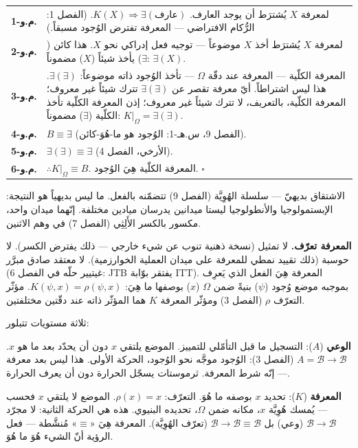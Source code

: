 \documentclass[10pt, openany, oneside]{book}
\renewcommand{\footnotesize}{\fontsize{8.5}{11}\selectfont}
\begin{document}
{\footnotesize
\noindent\begin{tabular}{r p{}}
\textbf{م.و-1.} & لمعرفة $X$ يُشترَط أن يوجد العارف. $K(X) \Rightarrow \exists(\text{عارف})$. (الفصل 1: الرُّكام الافتراضي --- المعرفة تفترض الوُجود مسبقاً.) \\[0.3em]
\textbf{م.و-2.} & لمعرفة $X$ يُشترَط أخذ $X$ موضوعاً --- توجيه فعل إدراكي نحو $X$. هذا كائن ($\exists$) يأخذ شيئاً ($X$) مضموناً: $\exists(X)$. \\[0.3em]
\textbf{م.و-3.} & المعرفة الكلّية --- المعرفة عند دقّة $\Omega$ --- تأخذ الوُجود ذاته موضوعاً: $\exists(\exists)$. هذا ليس اشتراطاً. أيّ معرفة تقصر عن $\exists(\exists)$ تترك شيئاً غير معروف؛ المعرفة الكلّية، بالتعريف، لا تترك شيئاً غير معروف؛ إذن المعرفة الكلّية تأخذ الكلّية ($\exists$) مضموناً: $K|_{\Omega} = \exists(\exists)$. \\[0.3em]
\textbf{م.و-4.} & $B \equiv \exists$ (الفصل 9، س.هـ-1: الوُجود هو ما-هُوَ-كائن). \\[0.3em]
\textbf{م.و-5.} & $\exists(\exists) \equiv \exists$ (الأرخي، الفصل 4). \\[0.3em]
\textbf{م.و-6.} & $\therefore K|_{\Omega} \equiv B$. المعرفة الكلّية هِيَ الوُجود. $\square$ \\[0.3em]
\end{tabular}
}

\vspace{0.8em}

\noindent الاشتقاق بديهيّ --- سلسلة الهُوِيَّة (الفصل 9) تتضمّنه بالفعل. ما ليس بديهياً هو النتيجة: الإبستمولوجيا والأنطولوجيا ليستا ميدانين يدرسان ميادين مختلفة. إنّهما ميدان واحد، مكسور بالكسر الأَلِثِي (الفصل 7) في وهم الاثنين.

\textbf{المعرفة تعرّف.} لا تمثيل (نسخة ذهنية تنوب عن شيء خارجي --- ذلك يفترض الكسر). لا حوسبة (ذلك تقييد نمطي للمعرفة على ميدان العملية الخوارزمية). لا معتقد صادق مبرَّر (غيتيير حلّه في الفصل 6: JTB يفتقر بوّابة ITT). المعرفة هِيَ الفعل الذي يَعرِف بموجبه موضع وُجود ($\psi$) بنيةً ضمن $\Omega$ ($x$) بوصفها ما هِيَ: $K(\psi, x) = \rho(\psi, x)$. مؤثّر التعرّف $\rho$ (الفصل 3) ومؤثّر المعرفة $K$ هما المؤثّر ذاته عند دقّتين مختلفتين.

ثلاثة مستويات تتبلور:

\textbf{الوعي} ($A$): التسجيل ما قبل التأمّلي للتمييز. الموضع يلتقي $x$ دون أن يحدّد بعد ما هو $x$. $A = \mathcal{B} \to \mathcal{B}$ (الفصل 3): الوُجود موجَّه نحو الوُجود، الحركة الأولى. هذا ليس بعد معرفة --- إنّه شرط المعرفة. ثرموستات يسجّل الحرارة دون أن يعرف الحرارة.

\textbf{المعرفة} ($K$): تحديد $x$ بوصفه ما هُوَ. التعرّف: $\rho(x) = x$. الموضع لا يلتقي $x$ فحسب --- يُمسك هُوِيَّة $x$، مكانه ضمن $\Omega$، تحديده البنيوي. هذه هي الحركة الثانية: لا مجرّد $\mathcal{B} \to \mathcal{B}$ (وعي) بل $\mathcal{B} \to \mathcal{B} \equiv \mathcal{B}$ (تعرّف الهُوِيَّة). المعرفة هِيَ «$\equiv$» مُنشَّطة --- فعل الرؤية أنّ الشيء هُوَ ما هُوَ.
\end{document}
